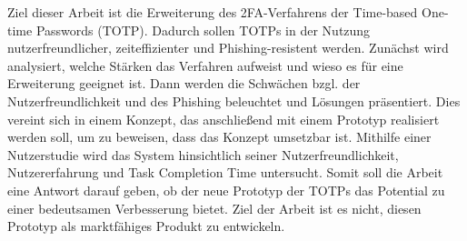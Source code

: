 Ziel dieser Arbeit ist die Erweiterung des 2FA-Verfahrens der Time-based One-time 
Passwords (TOTP). Dadurch sollen TOTPs in der Nutzung  nutzerfreundlicher, 
zeiteffizienter und Phishing-resistent werden. Zunächst wird analysiert, welche 
Stärken das Verfahren aufweist und wieso es für eine Erweiterung geeignet ist. Dann 
werden die Schwächen bzgl. der Nutzerfreundlichkeit und des Phishing beleuchtet und 
Lösungen präsentiert. Dies vereint sich in einem Konzept, das anschließend mit 
einem Prototyp realisiert werden soll, um zu beweisen, dass das Konzept umsetzbar 
ist. Mithilfe einer Nutzerstudie wird das System hinsichtlich seiner 
Nutzerfreundlichkeit, Nutzererfahrung und Task Completion Time untersucht. Somit 
soll die Arbeit eine Antwort darauf geben, ob der neue Prototyp der TOTPs das 
Potential zu einer bedeutsamen Verbesserung bietet. Ziel der Arbeit ist es nicht, 
diesen Prototyp als marktfähiges Produkt zu entwickeln.